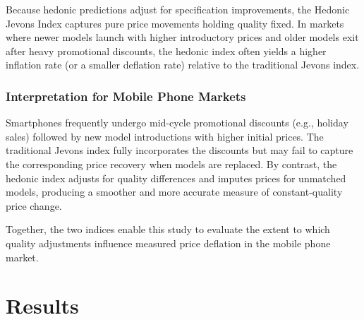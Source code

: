 \documentclass[12pt]{article}
\begin{document}
Because hedonic predictions adjust for specification improvements, the Hedonic Jevons Index captures pure price movements holding quality fixed. In markets where newer models launch with higher introductory prices and older models exit after heavy promotional discounts, the hedonic index often yields a higher inflation rate (or a smaller deflation rate) relative to the traditional Jevons index.

\subsubsection{Interpretation for Mobile Phone Markets}

Smartphones frequently undergo mid-cycle promotional discounts (e.g., holiday sales) followed by new model introductions with higher initial prices. The traditional Jevons index fully incorporates the discounts but may fail to capture the corresponding price recovery when models are replaced. By contrast, the hedonic index adjusts for quality differences and imputes prices for unmatched models, producing a smoother and more accurate measure of constant-quality price change.

Together, the two indices enable this study to evaluate the extent to which quality adjustments influence measured price deflation in the mobile phone market.


\section{Results}
\end{document}
